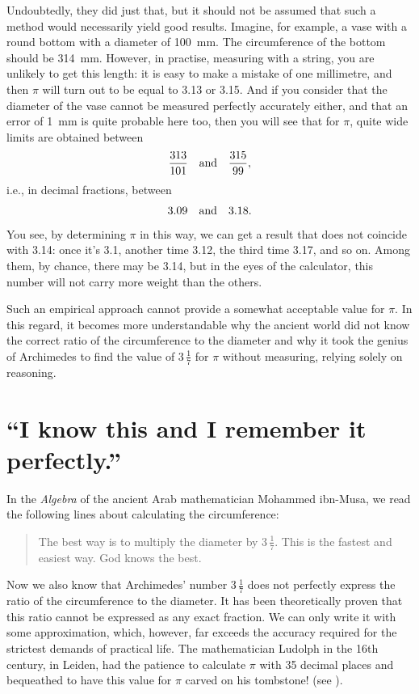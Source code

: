 Undoubtedly, they did just that, but it should not be assumed that such a method would necessarily yield good results. Imagine, for example, a vase with a round bottom with a diameter of \SI{100}{\milli\meter}. The circumference of the bottom should be \SI{314}{\milli\meter}. However, in practise, measuring with a string, you are unlikely to get this length: it is easy to make a mistake of one millimetre, and then $\pi$ will turn out to be equal to 3.13 or 3.15. And if you consider that the diameter of the vase cannot be measured perfectly accurately either, and that an error of \SI{1}{\milli\meter} is quite probable here too, then you will see that for $\pi$, quite wide limits are obtained between 
\begin{equation*}%
\frac{313}{101} \qand \frac{315}{99},
\end{equation*}
i.e., in decimal fractions, between 
\begin{equation*}%
3.09 \qand 3.18.
\end{equation*}
You see, by determining $\pi$ in this way, we can get a result that does not coincide with 3.14: once it's 3.1, another time 3.12, the third time 3.17, and so on. Among them, by chance, there may be 3.14, but in the eyes of the calculator, this number will not carry more weight than the others.

Such an empirical approach cannot provide a somewhat acceptable value for $\pi$. In this regard, it becomes more understandable why the ancient world did not know the correct ratio of the circumference to the diameter and why it took the genius of Archimedes to find the value of $3\,\frac{1}{7}$ for $\pi$ without measuring, relying solely on reasoning.



\section{``I know this and I remember it perfectly.''}
\label{sec-9.2}

In the \emph{Algebra} of the ancient Arab mathematician Mohammed ibn-Musa, we read the following lines about calculating the circumference:
\begin{quote}
The best way is to multiply the diameter by $3\,\frac{1}{7}$. This is the fastest and easiest way. God knows the best. 
\end{quote}
Now we also know that Archimedes' number $3\,\frac{1}{7}$ does not perfectly express the ratio of the circumference to the diameter. It has been theoretically proven that this ratio cannot be expressed as any exact fraction. We can only write it with some approximation, which, however, far exceeds the accuracy required for the strictest demands of practical life. The mathematician Ludolph in the 16th century, in Leiden, had the patience to calculate $\pi$ with 35 decimal places and bequeathed to have this value for $\pi$ carved on his tombstone! (see ).

